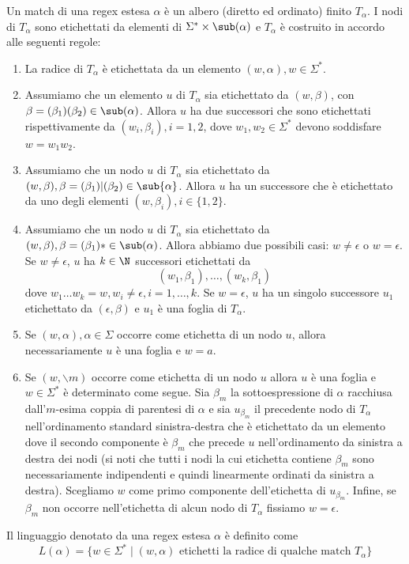 \begin{definizione}
	Un match di una regex estesa $\alpha$ è un albero (diretto ed ordinato) finito $T_{\alpha}$. I nodi di $T_{\alpha}$ sono etichettati da elementi di $\Sigma^* \times \sub(\alpha)$ e $T_{\alpha}$ è costruito in accordo alle seguenti regole:
	\begin{enumerate}
		\item La radice di $T_{\alpha}$ è etichettata da un elemento $(w, \alpha), w \in \Sigma^*$.
		
		\item Assumiamo che un elemento $u$ di $T_{\alpha}$ sia etichettato da $(w, \beta)$, con $\beta = (\beta_1)(\beta_2) \in \sub(\alpha)$. Allora $u$ ha due successori che sono etichettati rispettivamente da $(w_i, \beta_i), i = 1, 2$, dove $w_1, w_2 \in \Sigma^*$ devono soddisfare $w = w_1w_2$.
		
		\item Assumiamo che un nodo $u$ di $T_\alpha$ sia etichettato da $(w, \beta), \beta = (\beta_1)|(\beta_2) \in \sub{\alpha}$. Allora $u$ ha un successore che è etichettato da uno degli elementi $(w, \beta_i), i \in \{1, 2\}$.
		
		\item Assumiamo che un nodo $u$ di $T_{\alpha}$ sia etichettato da $(w, \beta), \beta = (\beta_{1})* \in \sub(\alpha)$. Allora abbiamo due possibili casi: $w \ne \epsilon$ o $w = \epsilon$. Se $w \ne \epsilon$, $u$ ha $k \in \N$ successori etichettati da
		$$ (w_1, \beta_1), \dots, (w_k, \beta_{1})$$
		dove $w_1 \dots w_k = w, w_i \ne \epsilon, i = 1, \dots, k$. Se $w = \epsilon$, $u$ ha un singolo successore $u_1$ etichettato da $(\epsilon, \beta)$ e $u_1$ è una foglia di $T_{\alpha}$.
		
		\item Se $(w, \alpha), \alpha \in \Sigma$ occorre come etichetta di un nodo $u$, allora necessariamente $u$ è una foglia e $w = a$.
		
		\item Se $(w, \backslash m)$ occorre come etichetta di un nodo $u$ allora $u$ è una foglia e $w \in \Sigma^*$ è determinato come segue. Sia $\beta_m$ la sottoespressione di $\alpha$ racchiusa dall'$m$-esima coppia di parentesi di $\alpha$ e sia $u_{\beta_m}$ il precedente nodo di $T_{\alpha}$ nell'ordinamento standard sinistra-destra che è etichettato da un elemento dove il secondo componente è $\beta_m$ che precede $u$ nell'ordinamento da sinistra a destra dei nodi (si noti che tutti i nodi la cui etichetta contiene $\beta_m$ sono necessariamente indipendenti e quindi linearmente ordinati da sinistra a destra). Scegliamo $w$ come primo componente dell'etichetta di $u_{\beta_m}$. Infine, se $\beta_m$ non occorre nell'etichetta di alcun nodo di $T_{\alpha}$ fissiamo $w = \epsilon$.
	\end{enumerate}
	Il linguaggio denotato da una regex estesa $\alpha$ è definito come
	$$ L(\alpha) = \{w \in \Sigma^* \mid (w, \alpha) \text{ etichetti la radice di qualche match } T_{\alpha}\} $$
\end{definizione}
